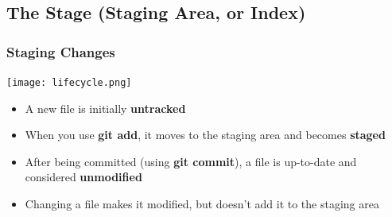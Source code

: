\documentclass{beamer}
\begin{document}
\subsection{The Stage (Staging Area, or Index)}

\begin{frame}
\frametitle{Staging Changes}
\begin{center}
\texttt{[image: lifecycle.png]}
\end{center}
\begin{itemize}
\item A new file is initially \textbf{untracked}
\item When you use \textbf{git add}, it moves to the staging area and becomes \textbf{staged}
\item After being committed (using \textbf{git commit}), a file is up-to-date and considered \textbf{unmodified}
\item Changing a file makes it modified, but doesn't add it to the staging area
\end{itemize}
\end{frame}
\end{document}
